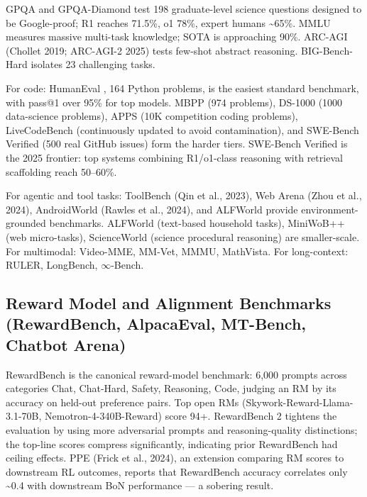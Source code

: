 \documentclass{article}
\begin{document}
GPQA \citep{rein2023gpqaagraduatelevel} and GPQA-Diamond test 198 graduate-level science questions designed to be Google-proof; R1 reaches 71.5\%, o1 78\%, expert humans \textasciitilde65\%. MMLU \citep{hendrycks2021measuringmathemati} measures massive multi-task knowledge; SOTA is approaching 90\%. ARC-AGI (Chollet 2019; ARC-AGI-2 2025) tests few-shot abstract reasoning. BIG-Bench-Hard isolates 23 challenging tasks.

For code: HumanEval \citep{chen20212021}, 164 Python problems, is the easiest standard benchmark, with pass@1 over 95\% for top models. MBPP (974 problems), DS-1000 (1000 data-science problems), APPS (10K competition coding problems), LiveCodeBench (continuously updated to avoid contamination), and SWE-Bench Verified (500 real GitHub issues) form the harder tiers. SWE-Bench Verified is the 2025 frontier: top systems combining R1/o1-class reasoning with retrieval scaffolding reach 50--60\%.

For agentic and tool tasks: ToolBench (Qin et al., 2023), Web Arena (Zhou et al., 2024), AndroidWorld (Rawles et al., 2024), and ALFWorld provide environment-grounded benchmarks. ALFWorld (text-based household tasks), MiniWoB++ (web micro-tasks), ScienceWorld (science procedural reasoning) are smaller-scale. For multimodal: Video-MME, MM-Vet, MMMU, MathVista. For long-context: RULER, LongBench, \(\infty\)-Bench.

\subsection{Reward Model and Alignment Benchmarks (RewardBench, AlpacaEval, MT-Bench, Chatbot Arena)}\label{reward-model-and-alignment-benchmarks-rewardbench-alpacaeval-mt-bench-chatbot-arena}

RewardBench \citep{lambert20242024} is the canonical reward-model benchmark: 6,000 prompts across categories Chat, Chat-Hard, Safety, Reasoning, Code, judging an RM by its accuracy on held-out preference pairs. Top open RMs (Skywork-Reward-Llama-3.1-70B, Nemotron-4-340B-Reward) score 94+. RewardBench 2 \citep{malik20252025} tightens the evaluation by using more adversarial prompts and reasoning-quality distinctions; the top-line scores compress significantly, indicating prior RewardBench had ceiling effects. PPE (Frick et al., 2024), an extension comparing RM scores to downstream RL outcomes, reports that RewardBench accuracy correlates only \textasciitilde0.4 with downstream BoN performance --- a sobering result.
\end{document}

